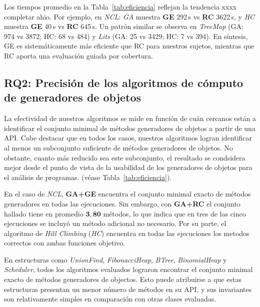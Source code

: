 

Los tiempos promedio en la Tabla~\ref{tab:eficiencia} reflejan la tendencia xxxx completar ahio. Por ejemplo, en \emph{NCL}:
\emph{GA} muestra \textbf{GE} 292\,s vs \textbf{RC} 3622\,s, y \emph{HC} muestra
\textbf{GE} 40\,s vs \textbf{RC} 645\,s. Un patrón similar se observa en
\emph{TreeMap} (GA: 974 vs 3872; HC: 68 vs 484) y \emph{Lits} (GA: 25 vs 3429; HC: 7 vs 394).
En síntesis, GE es sistemáticamente más eficiente que RC para nuestros sujetos,
mientras que RC aporta una evaluación guiada por cobertura.


\subsection{RQ2: Precisión de los algoritmos de cómputo de generadores de objetos}
\label{sec:experimentalIdentificacionPrecision}
La efectividad de nuestros algoritmos se mide en función de cuán cercanos están
a identificar el conjunto minimal de métodos 
generadores de objetos a partir de una API. 
Cabe destacar que en todos los casos, nuestros algoritmos 
logran identificar al menos un subconjunto suficiente de métodos generadores de objetos. No obstante, cuanto más reducido sea este subconjunto, el resultado se condsidera mejor desde el punto de vista de la
usabilidad de los generadores de objetos para el análisis de programas. (véase Tabla~\ref{tab:eficiencia}).

En el caso de \emph{NCL}, \textbf{GA+GE} encuentra el conjunto minimal exacto de métodos generadores en todas las ejecuciones.
Sin embargo, con \textbf{GA+RC} el conjunto hallado tiene en promedio \(\mathbf{3{,}80}\) métodos, 
lo que indica que en tres
de las cinco ejecuciones se incluyó un método adicional no necesario.
Por su parte, el algoritmo de \emph{Hill Climbing}
(\emph{HC}) encuentra en todas las ejecuciones los metodos correctos con ambas
funciones objetivo.

En estructuras como \emph{UnionFind}, \emph{FibonacciHeap}, \emph{BTree}, \emph{BinomialHeap} y \emph{Scheduler}, todos los 
algoritmos evaluados lograron encontrar el conjunto minimal exacto de métodos
generadores de objectos. Esto puede atribuirse a que estas 
estructuras presentan un menor número de métodos en su API, y sus invariantes son relativamente simples en comparación con otras 
clases evaluadas.

